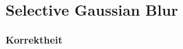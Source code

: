 \documentclass[10pt,a4paper]{article}
\begin{document}








\subsection{Selective Gaussian Blur}
\paragraph{Korrektheit}
\end{document}
